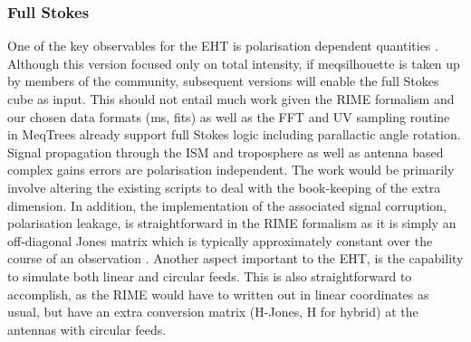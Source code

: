 \subsubsection{Full Stokes}\label{sec:full_stokes}
One of the key observables for the EHT is polarisation dependent quantities \citep{Johnson_2015b}. Although this version focused only on total intensity, if {\sc meqsilhouette} is taken up by members of the community, subsequent versions will enable the full Stokes cube as input. This should not entail much work given the RIME formalism and our chosen data formats ({\sc ms}, {\sc fits}) as well as the FFT and UV sampling routine in {\sc MeqTrees} already support full Stokes logic including parallactic angle rotation. Signal propagation through the ISM and troposphere as well as antenna based complex gains errors are polarisation independent. The work would be primarily involve altering the existing scripts to deal with the book-keeping of the extra dimension. In addition, the implementation of the associated signal corruption, polarisation leakage, is straightforward in the RIME formalism as it is simply an off-diagonal Jones matrix which is typically approximately constant over the course of an observation \citep{Johnson_2015b}. Another aspect important to the EHT, is the capability to simulate both linear and circular feeds. This is also straightforward to accomplish, as the RIME would have to written out in linear coordinates as usual, but have an extra conversion matrix (H-Jones, H for hybrid) at the antennas with circular feeds.


























